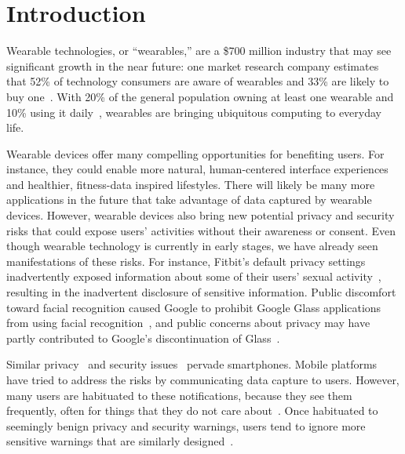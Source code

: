 
\section{Introduction}

Wearable technologies, or ``wearables,'' are a \$700 million industry \cite{cmo} that may see significant growth in the near future: one market research company estimates that 52\% of technology consumers are aware of wearables and 33\% are likely to buy one~\cite{NPD}. With 20\% of the general population owning at least one wearable and 10\% using it daily~\cite{WearableStatNews}, wearables are bringing ubiquitous computing to everyday life.


Wearable devices offer many compelling opportunities for benefiting users.  For instance, they could enable more natural, human-centered interface experiences and healthier, fitness-data inspired lifestyles. There will likely be many more applications in the future that take advantage of data captured by wearable devices. However, wearable devices also bring new potential privacy and security risks that could expose users' activities without their awareness or consent. Even though wearable technology is currently in early stages, we have already seen manifestations of these risks. For instance, Fitbit's default privacy settings inadvertently exposed information about some of their users' sexual activity~\cite{Fitbit}, resulting in the inadvertent disclosure of sensitive information. Public discomfort toward facial recognition caused Google to prohibit Google Glass applications from using facial recognition~\cite{GlassDetection}, and public concerns about privacy may have partly contributed to Google's discontinuation of Glass~\cite{14_dvorak_2014,1_russell_2014, 15_mashable_2014, 16_gross_2014}.

Similar privacy~\cite{kelley2013privacy, sadeh2009understanding, shklovski2014leakiness} and security issues~\cite{enck2011study, felt2011survey} pervade smartphones. Mobile platforms have tried to address the risks by communicating data capture to users. However, many users are habituated to these notifications, because they see them frequently, often for things that they do not care about~\cite{felt2012android}. Once habituated to seemingly benign privacy and security warnings, users tend to ignore more sensitive warnings that are similarly designed~\cite{Egelman08}.

